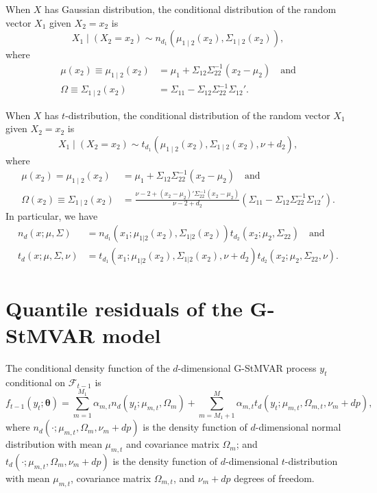 \documentclass[nojss]{jss} %
\begin{document}
\begin{appendix}
When $X$ has Gaussian distribution,  the conditional distribution of the random vector $X_1$ given $X_2=x_2$ is
\begin{equation}
X_1\mid(X_2=x_2)\sim n_{d_1}(\mu_{1\mid2}(x_2),\Sigma_{1\mid2}(x_2)),
\end{equation}
where
\begin{align}
\mu (x_2)\equiv \mu_{1\mid2}(x_2) &= \mu_1+\Sigma_{12}\Sigma_{22}^{-1}(x_2-\mu_2) \quad \text{and}\label{eq:mux_gaus} \\
\Omega \equiv \Sigma_{1\mid2}(x_2) &= \Sigma_{11}-\Sigma_{12}\Sigma_{22}^{-1}\Sigma_{12}'. \label{eq:omegax_gaus}
\end{align}

When $X$ has $t$-distribution, the conditional distribution of the random vector $X_1$ given $X_2=x_2$ is
\begin{equation}
X_1\mid(X_2=x_2)\sim t_{d_1}(\mu_{1\mid2}(x_2),\Sigma_{1\mid2}(x_2),\nu+d_2),
\end{equation}
where
\begin{align}
\mu (x_2) = \mu_{1\mid2}(x_2) &= \mu_1+\Sigma_{12}\Sigma_{22}^{-1}(x_2-\mu_2) \quad \text{and}\label{eq:mux} \\
\Omega (x_2) \equiv \Sigma_{1\mid2}(x_2) &= \frac{\nu-2+(x_2-\mu_2)'\Sigma_{22}^{-1}(x_2-\mu_2)}{\nu-2+d_2}(\Sigma_{11}-\Sigma_{12}\Sigma_{22}^{-1}\Sigma_{12}'). \label{eq:omegax}
\end{align}
In particular, we have
\begin{align}\label{eq:td_decomp}
n_d(x;\mu,\Sigma) &= n_{d_1}(x_1;\mu_{1|2}(x_2),\Sigma_{1|2}(x_2))t_{d_2}(x_2;\mu_2,\Sigma_{22}) \quad \text{and}\\
t_d(x;\mu,\Sigma,\nu) &= t_{d_1}(x_1;\mu_{1|2}(x_2),\Sigma_{1|2}(x_2),\nu+d_2)t_{d_2}(x_2;\mu_2,\Sigma_{22},\nu).
\end{align}



\section{Quantile residuals of the G-StMVAR model}\label{ap:qresexpr}
The conditional density function of the $d$-dimensional G-StMVAR process $y_t$ conditional on  $\mathcal{F}_{t-1}$ is
\begin{equation}\label{eq:gstmvarconddens}
f_{t-1}(y_t;\boldsymbol{\theta})=\sum_{m=1}^{M_1}\alpha_{m,t}n_d(y_t;\mu_{m,t},\Omega_{m}) + \sum_{m=M_1+1}^{M}\alpha_{m,t}t_d(y_t;\mu_{m,t},\Omega_{m,t},\nu_m + dp),
\end{equation}
where $n_d(\cdot;\mu_{m,t},\Omega_m,\nu_m + dp)$ is the density function of $d$-dimensional normal distribution with mean $\mu_{m,t}$ and covariance matrix $\Omega_{m}$; and  $t_d(\cdot;\mu_{m,t},\Omega_m,\nu_m + dp)$ is the density function of $d$-dimensional $t$-distribution with mean $\mu_{m,t}$, covariance matrix $\Omega_{m,t}$,  and $\nu_m + dp$ degrees of freedom.


\end{appendix}
\end{document}
